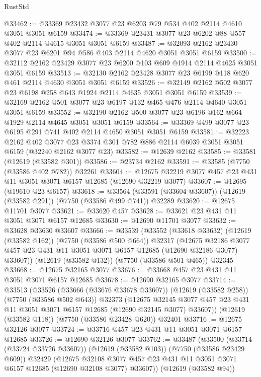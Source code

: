 \begin{lexlean}{RustStd}
\begin{coremodule}
@33462 := @33369 @23432 @3077 @23 @6203 @79 @534 @402 @2114 @4610 @3051 @3051 @6159
@33474 := @33369 @23431 @3077 @23 @6202 @88 @557 @402 @2114 @4615 @3051 @3051 @6159
@33487 := @32093 @2162 @23430 @3077 @23 @6201 @94 @586 @403 @2114 @4620 @3051 @3051 @6159
@33500 := @32112 @2162 @23429 @3077 @23 @6200 @103 @609 @1914 @2114 @4625 @3051 @3051 @6159
@33513 := @32130 @2162 @23428 @3077 @23 @6199 @118 @620 @461 @2114 @4630 @3051 @3051 @6159
@33526 := @32149 @2162 @502 @3077 @23 @6198 @258 @643 @1924 @2114 @4635 @3051 @3051 @6159
@33539 := @32169 @2162 @501 @3077 @23 @6197 @132 @465 @476 @2114 @4640 @3051 @3051 @6159
@33552 := @32190 @2162 @500 @3077 @23 @6196 @162 @664 @1929 @2114 @4645 @3051 @3051 @6159
@33564 := @33369 @499 @3077 @23 @6195 @291 @741 @402 @2114 @4650 @3051 @3051 @6159
@33581 := @32223
    @2162
    @402
    @3077
    @23
    @3374
    @301
    @782
    @886
    @2114
    @6039
    @3051
    @3051
    @6159
    (@32240 @2162 @3077 @23)
@33582 := @12639 @2162
@33585 := @33581 (@12619 (@33582 @301))
@33586 := @23734 @2162
@33591 := @33585 (@7750 (@33586 @402 @782)) @32261
@33604 := @12675 @32219 @3077 @457 @23 @431 @11 @3051 @3071 @6157 @12685 (@12690 @32219 @3077)
@33607 := @12695 (@19610 @23 @6157)
@33618 := @33564 (@33591 (@33604 @33607)) (@12619 (@33582 @291)) (@7750 (@33586 @499 @741)) @32289
@33620 := @12675 @11701 @3077
@33621 := @33620 @457
@33628 := @33621 @23 @431 @11 @3051 @3071 @6157 @12685
@33630 := @12690 @11701 @3077
@33632 := @33628 @33630 @33607
@33666 := @33539
    (@33552
      (@33618 @33632)
      (@12619 (@33582 @162))
      (@7750 (@33586 @500 @664))
      @32317
      (@12675 @32186 @3077 @457 @23 @431 @11 @3051 @3071 @6157 @12685 (@12690 @32186 @3077) @33607))
    (@12619 (@33582 @132))
    (@7750 (@33586 @501 @465))
    @32345
@33668 := @12675 @32165 @3077
@33676 := @33668 @457 @23 @431 @11 @3051 @3071 @6157 @12685
@33678 := @12690 @32165 @3077
@33714 := @33513
    (@33526
      (@33666 (@33676 @33678 @33607))
      (@12619 (@33582 @258))
      (@7750 (@33586 @502 @643))
      @32373
      (@12675 @32145 @3077 @457 @23 @431 @11 @3051 @3071 @6157 @12685 (@12690 @32145 @3077) @33607))
    (@12619 (@33582 @118))
    (@7750 (@33586 @23428 @620))
    @32401
@33716 := @12675 @32126 @3077
@33724 := @33716 @457 @23 @431 @11 @3051 @3071 @6157 @12685
@33726 := @12690 @32126 @3077
@33762 := @33487
    (@33500
      (@33714 (@33724 @33726 @33607))
      (@12619 (@33582 @103))
      (@7750 (@33586 @23429 @609))
      @32429
      (@12675 @32108 @3077 @457 @23 @431 @11 @3051 @3071 @6157 @12685 (@12690 @32108 @3077) @33607))
    (@12619 (@33582 @94))

\end{coremodule}
\end{lexlean}
